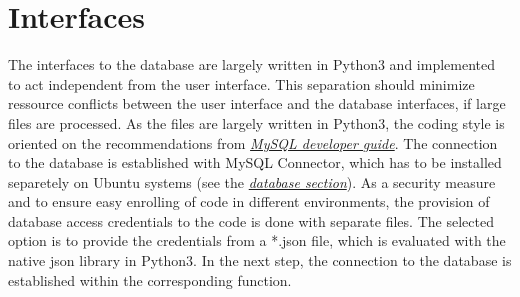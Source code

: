 
\section{Interfaces}
The interfaces to the database are largely written in Python3 and implemented to act independent from the user interface. This separation should minimize ressource conflicts between the user 
interface and the database interfaces, if large files are processed. As the files are largely written in Python3, the coding style is oriented on the recommendations from 
\href{https://dev.mysql.com/doc/connector-python/en/}{\textit{MySQL developer guide}}. The connection to the database is established with MySQL Connector, which has to be installed separetely on Ubuntu 
systems (see the \hyperref[Database installation and configuration]{\textit{database section}}). 
As a security measure and to ensure easy enrolling of code in different environments, the provision of database access credentials to the code is done with separate files. The selected option is to 
provide the credentials from a *.json file, which is evaluated with the native json library in Python3. In the next step, the connection to the database is established within the corresponding 
function.\\
